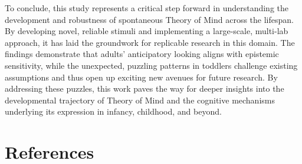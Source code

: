 \documentclass[
  man,floatsintext]{apa6}
\begin{document}
To conclude, this study represents a critical step forward in understanding the development and robustness of spontaneous Theory of Mind across the lifespan. By developing novel, reliable stimuli and implementing a large-scale, multi-lab approach, it has laid the groundwork for replicable research in this domain. The findings demonstrate that adults' anticipatory looking aligns with epistemic sensitivity, while the unexpected, puzzling patterns in toddlers challenge existing assumptions and thus open up exciting new avenues for future research. By addressing these puzzles, this work paves the way for deeper insights into the developmental trajectory of Theory of Mind and the cognitive mechanisms underlying its expression in infancy, childhood, and beyond.

\newpage

\section{References}\label{references}

\begingroup
\setlength{\parindent}{-0.5in}
\setlength{\leftskip}{0.5in}
\end{document}
